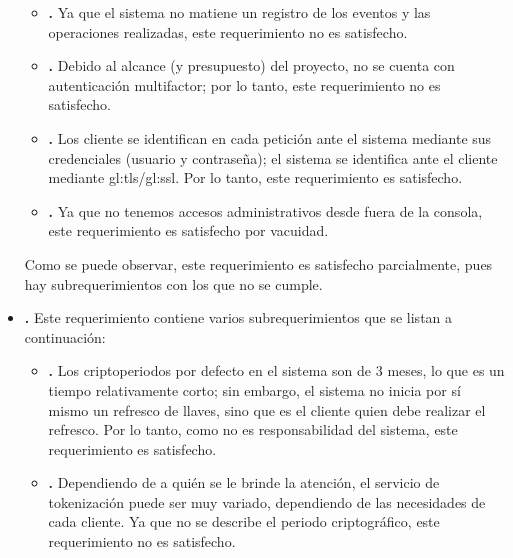 \begin{itemize}
\begin{itemize}
      \item \textbf{.}
        Ya que el sistema no matiene un registro de los eventos y las
        operaciones realizadas, este requerimiento no es satisfecho.

      \item \textbf{.}
        Debido al alcance (y presupuesto) del proyecto, no se cuenta con
        autenticación multifactor; por lo tanto, este requerimiento no es
        satisfecho.

      \item \textbf{.}
        Los cliente se identifican en cada petición ante el sistema mediante
        sus credenciales (usuario y contraseña); el sistema se identifica
        ante el cliente mediante \acrshort{gl:tls}/\acrshort{gl:ssl}. Por lo
        tanto, este requerimiento es satisfecho.

      \item \textbf{.}
        Ya que no tenemos accesos administrativos desde fuera de la consola,
        este requerimiento es satisfecho por vacuidad.

    \end{itemize}
    Como se puede observar, este requerimiento es satisfecho parcialmente, pues
    hay subrequerimientos con los que no se cumple.

  \item \textbf{.}
    Este requerimiento contiene varios subrequerimientos que se listan a
    continuación:
    \begin{itemize}
      \item \textbf{.}
        Los criptoperiodos por defecto en el sistema son de 3 meses, lo que
        es un tiempo relativamente corto; sin embargo, el sistema no inicia
        por sí mismo un refresco de llaves, sino que es el cliente quien debe
        realizar el refresco. Por lo tanto, como no es responsabilidad del
        sistema, este requerimiento es satisfecho.

      \item \textbf{.}
        Dependiendo de a quién se le brinde la atención, el servicio de
        tokenización puede ser muy variado, dependiendo de las necesidades de
        cada cliente. Ya que no se describe el periodo criptográfico, este
        requerimiento no es satisfecho.


\end{itemize}
\end{itemize}
